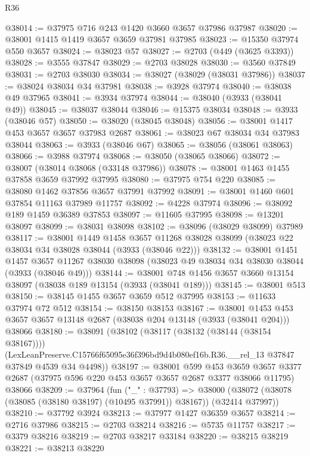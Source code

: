 \begin{lexlean}{R36}
\begin{coremodule}
@38014 := @37975 @716 @243 @1420 @3660 @3657 @37986 @37987
@38020 := @38001 @1415 @1419 @3657 @3659 @37981 @37985
@38023 := @15350 @37974 @550 @3657
@38024 := @38023 @57
@38027 := @2703 (@449 (@3625 @3393))
@38028 := @3555 @37847
@38029 := @2703 @38028
@38030 := @3560 @37849
@38031 := @2703 @38030
@38034 := @38027 (@38029 (@38031 @37986))
@38037 := @38024 @38034 @34 @37981
@38038 := @3928 @37974
@38040 := @38038 @49 @37965
@38041 := @3934 @37974
@38044 := @38040 (@3933 (@38041 @49))
@38045 := @38037 @38044
@38046 := @15375 @38034
@38048 := @3933 (@38046 @57)
@38050 := @38020 (@38045 @38048)
@38056 := @38001 @1417 @453 @3657 @3657 @37983 @2687
@38061 := @38023 @67 @38034 @34 @37983 @38044
@38063 := @3933 (@38046 @67)
@38065 := @38056 (@38061 @38063)
@38066 := @3988 @37974
@38068 := @38050 (@38065 @38066)
@38072 := @38007 (@38014 @38068 (@33148 @37986))
@38078 := @38001 @1463 @1455 @37858 @3659 @37992 @37995
@38080 := @37975 @754 @220
@38085 := @38080 @1462 @37856 @3657 @37991 @37992
@38091 := @38001 @1460 @601 @37854 @11163 @37989 @11757
@38092 := @4228 @37974
@38096 := @38092 @189 @1459 @36389 @37853
@38097 := @11605 @37995
@38098 := @13201 @38097
@38099 := @38031 @38098
@38102 := @38096 (@38029 @38099) @37989
@38117 := @38001
    @1449
    @1458
    @3657
    @11268
    @38028
    @38099
    (@38023 @22 @38034 @34 @38028 @38044 (@3933 (@38046 @22)))
@38132 := @38001
    @1451
    @1457
    @3657
    @11267
    @38030
    @38098
    (@38023 @49 @38034 @34 @38030 @38044 (@3933 (@38046 @49)))
@38144 := @38001 @748 @1456 @3657 @3660 @13154 @38097 (@38038 @189 @13154 (@3933 (@38041 @189)))
@38145 := @38001 @513
@38150 := @38145 @1455 @3657 @3659 @512 @37995
@38153 := @11633 @37974 @72 @512
@38154 := @38150 @38153
@38167 := @38001
    @1453
    @453
    @3657
    @3657
    @13148
    @2687
    (@38038 @204 @13148 (@3933 (@38041 @204)))
    @38066
@38180 := @38091
    (@38102
      (@38117 (@38132 (@38144 (@38154 @38167))))
      (LexLeanPreserve.C15766f65095e36f396bd9d4b080ef16b.R36.__rel_13
        @37847
        @37849
        @4539
        @34
        @4498))
@38197 := @38001
    @599
    @453
    @3659
    @3657
    @3377
    @2687
    (@37975 @596 @220 @453 @3657 @3657 @2687 @3377 @38066 @11795)
    @38066
@38209 := @37964
    (fun ("_" : @37793) =>
    @38000 (@38072 (@38078 (@38085 (@38180 @38197) (@10495 @37991)) @38167)) (@32414 @37997))
@38210 := @37792 @3924
@38213 := @37977 @1427 @36359 @3657
@38214 := @2716 @37986
@38215 := @2703 @38214
@38216 := @5735 @11757
@38217 := @3379 @38216
@38219 := @2703 @38217 @33184
@38220 := @38215 @38219
@38221 := @38213 @38220

\end{coremodule}
\end{lexlean}
